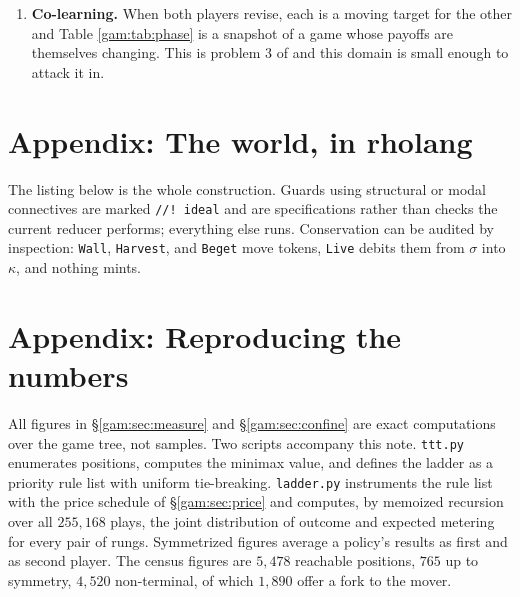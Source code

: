 \begin{enumerate}
\item \textbf{Co-learning.} When both players revise, each is a moving target
for the other and Table \ref{gam:tab:phase} is a snapshot of a game whose payoffs
are themselves changing. This is problem 3 of \chSci and this domain
is small enough to attack it in.
\end{enumerate}


\section{Appendix: The world, in rholang}\label{gam:app:code}\label{gam:S13}

The listing below is the whole construction. Guards using structural or modal
connectives are marked \texttt{//!\ ideal} and are specifications rather than
checks the current reducer performs; everything else runs. Conservation can be
audited by inspection: \texttt{Wall}, \texttt{Harvest}, and \texttt{Beget} move
tokens, \texttt{Live} debits them from $\sigma$ into $\kappa$, and nothing
mints.



\section{Appendix: Reproducing the numbers}\label{gam:app:repro}\label{gam:S14}

All figures in \S\ref{gam:sec:measure} and \S\ref{gam:sec:confine} are exact
computations over the game tree, not samples. Two scripts accompany this note.
\texttt{ttt.py} enumerates positions, computes the minimax value, and defines
the ladder as a priority rule list with uniform tie-breaking.
\texttt{ladder.py} instruments the rule list with the price schedule of
\S\ref{gam:sec:price} and computes, by memoized recursion over all $255{,}168$
plays, the joint distribution of outcome and expected metering for every pair of
rungs. Symmetrized figures average a policy's results as first and as second
player. The census figures are $5{,}478$ reachable positions, $765$ up to
symmetry, $4{,}520$ non-terminal, of which $1{,}890$ offer a fork to the mover.


